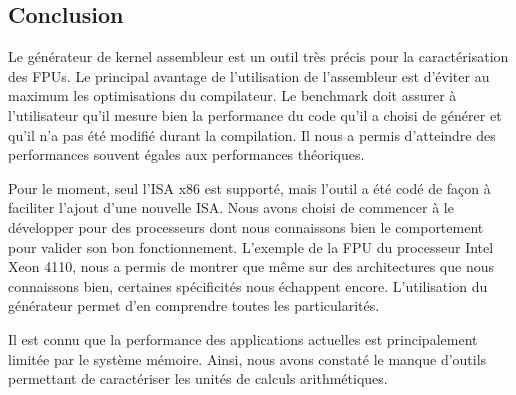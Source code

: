        
        




    
    



    



\subsection{Conclusion}
    
    Le générateur de kernel assembleur est un outil très précis pour la caractérisation des FPUs. Le principal avantage de l'utilisation de l'assembleur est d'éviter au maximum les optimisations du compilateur. Le benchmark doit assurer à l'utilisateur qu'il mesure bien la performance du code qu'il a choisi de générer et qu'il n'a pas été modifié durant la compilation. Il nous a permis d'atteindre des performances souvent égales aux performances théoriques. 
    
    Pour le moment, seul l'ISA x86 est supporté, mais l'outil a été codé de façon à faciliter l'ajout d'une nouvelle ISA. Nous avons choisi de commencer à le développer pour des processeurs dont nous connaissons bien le comportement pour valider son bon fonctionnement. L'exemple de la FPU du processeur Intel Xeon 4110, nous a permis de montrer que même sur des architectures que nous connaissons bien, certaines spécificités nous échappent encore. L'utilisation du générateur permet d'en comprendre toutes les particularités.
    
    Il est connu que la performance des applications actuelles est principalement limitée par le système mémoire. Ainsi, nous avons constaté le manque d'outils permettant de caractériser les unités de calculs arithmétiques. 
    
